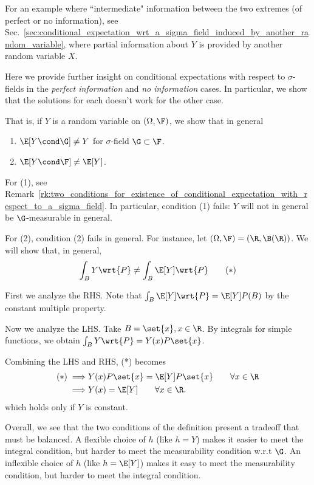 \documentclass{article} %
\begin{document}
\begin{remark}
For an example where ``intermediate" information between the two extremes (of perfect or no information), see Sec.~\ref{sec:conditional_expectation_wrt_a_sigma_field_induced_by_another_random_variable}, where partial information about $Y$ is provided by another random variable $X$.	
\end{remark}


\begin{remark}
Here we provide further insight on conditional expectations with respect to $\sigma$-fields in the \textit{perfect information} and \textit{no information} cases.  In particular, we show that the solutions for each doesn't work for the other case. 

That is, if $Y$ is a random variable on $(\Omega, \F)$, we show that in general
\begin{enumerate}
	\item $\E[Y \cond \G] \neq Y$ for $\sigma$-field $\G \subset \F$. 
	\item $\E[Y \cond \F] \neq \E[Y]$.
\end{enumerate}
For (1), see Remark~\ref{rk:two_conditions_for_existence_of_conditional_expectation_with_respect_to_a_sigma_field}.  In particular, condition (1) fails: $Y$ will not in general be $\G$-measurable in general.

For (2), condition (2) fails in general.  For instance, let $(\Omega, \F)=(\R, \B(\R))$.  We will show that, in general,
\[ \int_B Y \wrt{P} \neq \int_B \E[Y] \wrt{P} \quad \quad (*) \]  

First we analyze the RHS.  Note that $\int_B \E[Y] \wrt{P} = \E[Y] P(B)$ by the constant multiple property. 

Now we analyze the LHS. Take $B=\set{x}, x \in \R$.  By integrals for simple functions, we obtain $\int_B Y \wrt{P} = Y(x) P\set{x}$.

Combining the LHS and RHS, (*) becomes 
\begin{align*}
(*) \implies & Y(x) P\set{x} = \E[Y] P\set{x} \quad \quad \forall x \in \R \\
\implies  & Y(x)= \E[Y]  \quad \quad  \forall x \in \R.	
\end{align*}
which holds only if $Y$ is constant.

Overall, we see that the two conditions of the definition present a tradeoff that must be balanced.  A flexible choice of $h$ (like $h=Y$) makes it easier to meet the integral condition, but harder to meet the measurability condition w.r.t $\G$.  An inflexible choice of $h$ (like $h=\E[Y]$) makes it easy to meet the measurability condition, but harder to meet the integral condition.

\end{remark}
\end{document}

